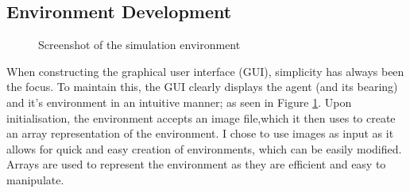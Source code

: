 \documentclass[12pt]{article}
\begin{document}
\subsection{Environment Development}
\begin{figure}[H]
    \centering
    \caption{Screenshot of the simulation environment}
    \label{fig:environment_example}
\end{figure}
When constructing the graphical user interface (GUI), simplicity has always been the focus. To maintain this, the GUI clearly displays
the agent (and its bearing) and it's environment in an intuitive manner; as seen in Figure \ref{fig:environment_example}. Upon
initialisation, the environment accepts an image file,which it then uses to create an array representation of the environment. I chose
to use images as input as it allows for quick and easy creation of environments, which can be easily modified. Arrays are used to
represent the environment as they are efficient and easy to manipulate.\\
\end{document}
